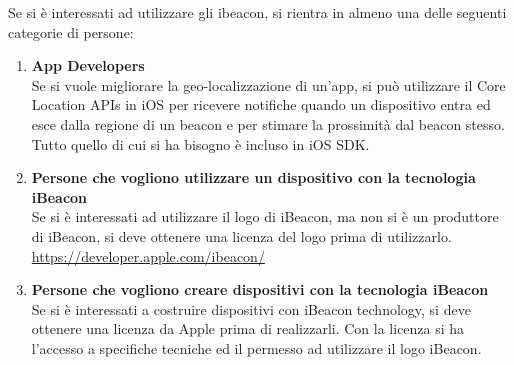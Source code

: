 Se si è interessati ad utilizzare gli ibeacon, si rientra in almeno una delle seguenti categorie di persone:
\begin{enumerate}
\item \textbf{App Developers}
\\Se si vuole migliorare la geo-localizzazione di un'app, si può utilizzare il Core Location APIs in iOS per ricevere notifiche quando un dispositivo entra ed esce dalla regione di un beacon e per stimare la prossimità dal beacon stesso. 
Tutto quello di cui si ha bisogno è incluso in iOS SDK.
\item \textbf{Persone che vogliono utilizzare un dispositivo con la tecnologia iBeacon}
\\Se si è interessati ad utilizzare il logo di iBeacon, ma non si è un produttore di iBeacon, si deve ottenere una licenza del logo prima di utilizzarlo.
\url{https://developer.apple.com/ibeacon/}   
\item \textbf{Persone che vogliono creare dispositivi con la tecnologia iBeacon}
\\Se si è interessati a costruire dispositivi con iBeacon technology, si deve ottenere una licenza da Apple prima di realizzarli. 
Con la licenza si ha l'accesso a specifiche tecniche  ed il permesso ad utilizzare il logo iBeacon. 
\end{enumerate}

